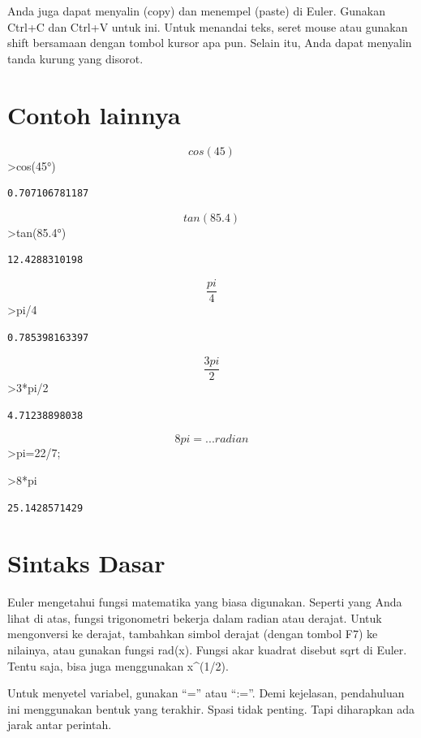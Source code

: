 \documentclass[
]{book}
\begin{document}
Anda juga dapat menyalin (copy) dan menempel (paste) di Euler. Gunakan Ctrl+C dan Ctrl+V untuk ini. Untuk menandai teks, seret mouse atau gunakan shift bersamaan dengan tombol kursor apa pun. Selain itu, Anda dapat menyalin tanda kurung yang disorot.

\section{Contoh lainnya}\label{contoh-lainnya}

\[cos(45) \]\textgreater cos(45°)

\begin{verbatim}
0.707106781187
\end{verbatim}

\[tan (85.4)\]\textgreater tan(85.4°)

\begin{verbatim}
12.4288310198
\end{verbatim}

\[\frac {pi}{4}\]\textgreater pi/4

\begin{verbatim}
0.785398163397
\end{verbatim}

\[\frac{3pi}{2}\]\textgreater3*pi/2

\begin{verbatim}
4.71238898038
\end{verbatim}

\[8pi=...radian\]\textgreater pi=22/7;

\textgreater8*pi

\begin{verbatim}
25.1428571429
\end{verbatim}

\section{Sintaks Dasar}\label{sintaks-dasar}

Euler mengetahui fungsi matematika yang biasa digunakan. Seperti yang Anda lihat di atas, fungsi trigonometri bekerja dalam radian atau derajat. Untuk mengonversi ke derajat, tambahkan simbol derajat (dengan tombol F7) ke nilainya, atau gunakan fungsi rad(x). Fungsi akar kuadrat disebut sqrt di Euler. Tentu saja, bisa juga menggunakan x\^{}(1/2).

Untuk menyetel variabel, gunakan ``='' atau ``:=''. Demi kejelasan, pendahuluan ini menggunakan bentuk yang terakhir. Spasi tidak penting. Tapi diharapkan ada jarak antar perintah.
\end{document}
